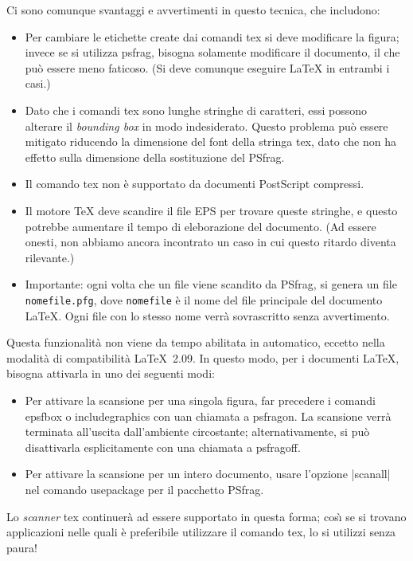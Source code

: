 \documentclass[a4paper,11pt]{ltxguide}
\let\pkg\textsf
\let\fname\texttt
\newcommand{\pfg}{\pkg{PSfrag}}
\def\cs#1{%
  {\ttfamily\expandafter\string\csname #1\endcsname}}
\begin{document}
Ci sono comunque svantaggi e avvertimenti in questo tecnica, che includono:
\begin{itemize}
\item Per cambiare le etichette create dai comandi \cs{tex} si deve
  modificare la figura; invece se si utilizza \cs{psfrag}, bisogna
  solamente modificare il documento, il che pu\`o essere meno
  faticoso. (Si deve comunque eseguire \LaTeX{} in entrambi i casi.)
\item Dato che i comandi \cs{tex} sono lunghe stringhe di caratteri, essi 
        possono alterare il \emph{bounding box} in modo
        indesiderato. Questo problema pu\`o essere mitigato riducendo la 
        dimensione del font della stringa \cs{tex}, dato che non ha effetto
        sulla dimensione della sostituzione del \pfg.
\item Il comando \cs{tex} non \`e supportato da documenti PostScript 
        compressi.
\item Il motore \TeX{} deve scandire il file EPS per trovare queste
        stringhe, e questo potrebbe aumentare il tempo di eleborazione
        del documento. (Ad essere onesti, 
        non abbiamo ancora incontrato un caso in
        cui questo ritardo diventa rilevante.)    
\item Importante: ogni volta che un file viene scandito da \pfg, si genera
        un file \fname{nomefile.pfg}, dove \fname{nomefile} 
        \`e il nome del file principale del documento \LaTeX{}. 
        Ogni file con lo stesso nome verr\`a sovrascritto 
        senza avvertimento.
\end{itemize}

Questa funzionalit\`a non viene da tempo abilitata in automatico, eccetto
nella modalit\`a di compatibilit\`a \LaTeX\ 2.09. In questo modo, per i
documenti \LaTeX{}, bisogna attivarla in uno dei seguenti modi:
\begin{itemize}
\item Per attivare la scansione per una singola figura, far precedere i comandi
        \cs{epsfbox} o \cs{includegraphics} con uan chiamata a \cs{psfragon}.
        La scansione verr\`a terminata all'uscita dall'ambiente circostante;
        alternativamente, si pu\`o disattivarla esplicitamente con una chiamata
        a \cs{psfragoff}.
\item Per attivare la scansione per un intero documento, usare l'opzione
        |scanall| nel comando \cs{usepackage} per il pacchetto \pfg.
\end{itemize}
Lo \emph{scanner} \cs{tex} continuer\`a ad essere supportato 
in questa forma; cos\`{\i} se si trovano applicazioni nelle quali 
\`e preferibile utilizzare il comando \cs{tex}, lo si utilizzi senza paura!
\end{document}
